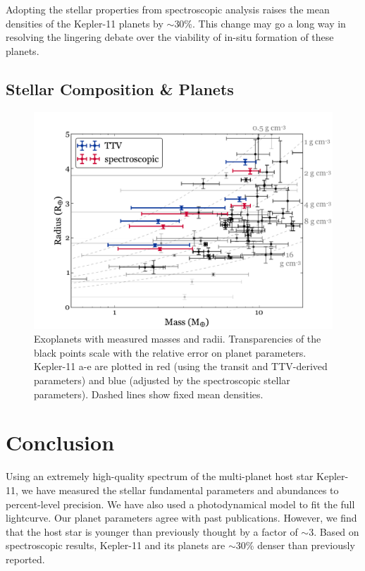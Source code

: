 \documentclass[oneside]{emulateapj}
\begin{document}
Adopting the stellar properties from spectroscopic analysis raises the mean densities of the Kepler-11 planets by $\sim$30\%. This change may go a long way in resolving the lingering debate over the viability of in-situ formation of these planets. 

\subsection{Stellar Composition \& Planets}


\begin{figure}
\centering
\includegraphics[scale=0.6]{K11_massradius}
\caption{Exoplanets with measured masses and radii. Transparencies of the black points scale with the relative error on planet parameters. Kepler-11 a-e are plotted in red (using the transit and TTV-derived parameters) and blue (adjusted by the spectroscopic stellar parameters). Dashed lines show fixed mean densities.}
\label{fig:mr}
\end{figure}


\section{Conclusion}

Using an extremely high-quality spectrum of the multi-planet host star Kepler-11, we have measured the stellar fundamental parameters and abundances to percent-level precision. We have also used a photodynamical model to fit the full \Kepler lightcurve. Our planet parameters agree with past publications. However, we find that the host star is younger than previously thought by a factor of $\sim$3. Based on spectroscopic results, Kepler-11 and its planets are $\sim$30\% denser than previously reported.
\end{document}
